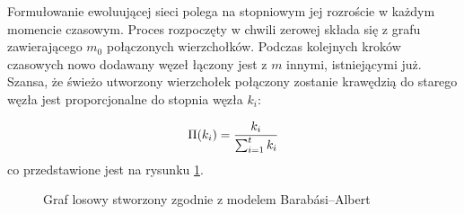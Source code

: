 \documentclass[a4paper, 12pt, twoside, openright]{article}
\begin{document}
 
 
	Formułowanie ewoluującej sieci polega na stopniowym jej rozroście w każdym momencie czasowym. Proces rozpoczęty w chwili zerowej składa się z grafu zawierającego $m_0$ połączonych wierzchołków. Podczas kolejnych kroków czasowych nowo dodawany węzeł łączony jest z $m$ innymi, istniejącymi już. Szansa, że świeżo utworzony wierzchołek połączony zostanie krawędzią do starego węzła jest proporcjonalne do stopnia węzła $k_i$:
	
	\begin{equation}
		\Pi (k_i) = { k_i \over {\sum_{i=1}^{t} k_i} }
	\end{equation}
	co przedstawione jest na rysunku \ref{BarabasiImg1}.
	
		\begin{figure}[!hbt]
		\centering
		\quad
		\quad
		\quad
		
		\caption[]{Graf losowy stworzony zgodnie z modelem Barabási–Albert}
		\label{BarabasiImg1}
	\end{figure}
 	
\end{document}
